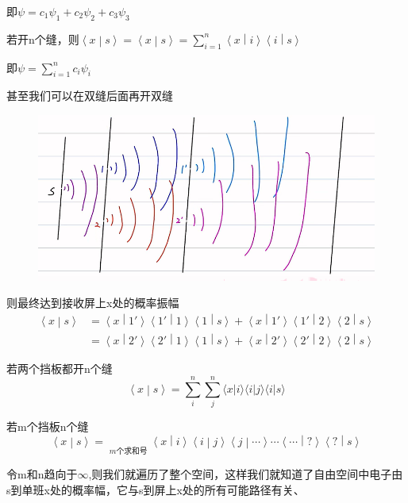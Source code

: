 \documentclass[lang=cn,15pt]{elegantbook}
\begin{document}
即$\psi=c_1\psi_1+c_2\psi_2+c_3\psi_3$

若开n个缝，则$\left< x \middle| s \right>=\left< x \middle| s \right> =\sum_{i=1}^n{\left< x \middle| i \right> \left< i \middle| s \right>}
$

即$\psi=\sum_{i=1}^n{c_i\psi_i}$

甚至我们可以在双缝后面再开双缝
\begin{figure}[H]
	\centering
	\includegraphics[width=0.7\linewidth]{figure/screenshot009}
\end{figure}

则最终达到接收屏上x处的概率振幅
\begin{equation}
	\begin{split}
		\left< x \middle| s \right> &=\left< x \middle| 1 '\right> \left< 1' \middle| 1 \right> \left< 1 \middle| s \right> +\left< x \middle| 1' \right> \left< 1' \middle| 2 \right> \left< 2 \middle| s \right> 
		\\
		&=\left< x \middle| 2 '\right> \left< 2' \middle| 1 \right> \left< 1 \middle| s \right> +\left< x \middle| 2' \right> \left< 2' \middle| 2 \right> \left< 2 \middle| s \right> 
	\end{split}
\end{equation}

若两个挡板都开n个缝
\begin{equation}
	\left< x \middle| s \right> =\sum_i^n{\sum_j^n{\langle x|i\rangle \langle i|j\rangle \langle i|s\rangle}}
\end{equation}

若m个挡板n个缝
\begin{equation}
	\left< x \middle| s \right> =\mathop {\underbrace{\sum_i^n{\sum_j^n{\sum_k^n{\cdots \sum_?^n{}}}}}} \limits_{m\text{个求和号}}\left< x \middle| i \right> \left< i \middle| j \right> \left< j \middle| \cdots \right> \cdots \left< \cdots \middle| ? \right> \left< ? \middle| s \right> 
\end{equation}

令m和n趋向于$\infty$,则我们就遍历了整个空间，这样我们就知道了自由空间中电子由s到单班x处的概率幅，它与s到屏上x处的所有可能路径有关、
\end{document}
